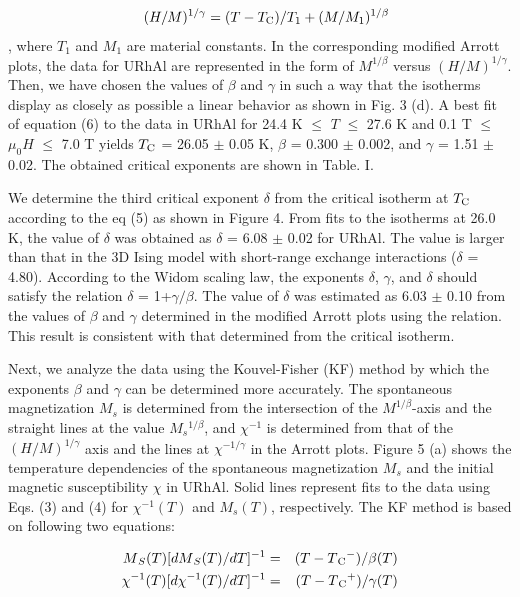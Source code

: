 \documentclass[twocolumn,showpacs,preprintnumbers,amsmath,amssymb]{revtex4}
\begin{document}
   \begin{eqnarray}
  &&(H/M){^{1/{\gamma}}} = (T-{T_{\rm C}})/{T_1} + (M/{M_{1}})^{1/{\beta}}
   \end{eqnarray}
, where $T_1$ and $M_1$ are material constants. In the corresponding modified Arrott plots, the data for URhAl are represented in the form of $M^{1/{\beta}}$ versus $(H/M)^{1/{\gamma}}$. Then, we have chosen the values of $\beta$ and $\gamma$ in such a way that the isotherms display as closely as possible a linear behavior as shown in Fig. 3 (d). A best fit of equation (6) to the data in URhAl for 24.4 K $\le$ $T$ $\le$ 27.6 K and 0.1 T $\le$ ${{\mu}_0}H$ $\le$ 7.0 T yields $T_{\rm C}$ = 26.05 $\pm$ 0.05 K, $\beta$ = 0.300 $\pm$ 0.002, and ${\gamma}$ = 1.51 $\pm$ 0.02. The obtained critical exponents are shown in Table. I. 

   We determine the third critical exponent $\delta$ from the critical isotherm at $T_{\rm C}$ according to the eq (5) as shown in Figure 4. From fits to the isotherms at 26.0 K, the value of $\delta$ was obtained as $\delta$ = 6.08 $\pm$ 0.02 for URhAl. The value is larger than that in the 3D Ising model with short-range exchange interactions ($\delta$ = 4.80). According to the Widom scaling law, the exponents $\delta$, $\gamma$, and $\delta$ should satisfy the relation ${\delta}$ = 1+${\gamma}/{\beta}$\cite{widom}. The value of ${\delta}$ was estimated as 6.03 $\pm$ 0.10 from the values of $\beta$ and $\gamma$ determined in the modified Arrott plots using the relation. This result is consistent with that determined from the critical isotherm. 

 Next, we analyze the data using the Kouvel-Fisher (KF) method by which the exponents $\beta$ and $\gamma$ can be determined more accurately\cite{kouvel}. The spontaneous magnetization $M{_s}$ is determined from the intersection of the $M^{1/{\beta}}$-axis and the straight lines at the value $M{_s}^{1/{\beta}}$, and ${\chi}^{-1}$ is determined from that of the $(H/M)^{1/{\gamma}}$ axis and the lines at ${\chi}^{-1/{\gamma}}$ in the Arrott plots. Figure 5 (a) shows the temperature dependencies of the spontaneous magnetization $M{_s}$ and the initial magnetic susceptibility ${\chi}$ in URhAl. Solid lines represent fits to the data using Eqs. (3) and (4) for ${\chi}^{-1}(T)$ and $M{_s}(T)$, respectively. The KF method is based on following two equations:
 
        \begin{eqnarray}
 M{_S}(T)[dM{_S}(T)/dT]{^{-1}} &=& (T-T{_{\rm C}}^{-})/{\beta}(T)\\ 
  {{\chi}}{^{-1}}(T)[d {{\chi}}{^{-1}}(T)/dT]{^{-1}} &=& (T-T{_{\rm C}}^{+})/{\gamma}(T)
   \end{eqnarray}
\end{document}

